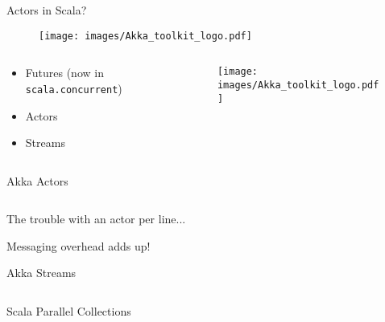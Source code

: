 \documentclass[aspectratio=169,14pt]{beamer}
\newcommand{\megatext}[1]{
  \begin{center}
    \Huge
    #1
  \end{center}
}
\newcommand{\bigtext}[1]{
  \begin{center}
    \Large
    #1
  \end{center}
}
\begin{document}
\begin{frame}
  \megatext{Actors in Scala?}
\end{frame}


\begin{frame}
  \begin{figure}
    \texttt{[image: images/Akka\_toolkit\_logo.pdf]}
  \end{figure}
\end{frame}

\begin{frame}
  \begin{columns}[c]
    \begin{column}{0.5\textwidth}
      \begin{itemize}
      \item Futures (now in \texttt{scala.concurrent})
      \item Actors
      \item Streams
      \end{itemize}
    \end{column}

    \begin{column}{0.5\textwidth}
      \begin{figure}
        \texttt{[image: images/Akka\_toolkit\_logo.pdf]}
      \end{figure}
    \end{column}
  \end{columns}
\end{frame}


\begin{frame}[fragile]{Akka Actors}
  \inputminted{scala}{snippets/actor.scala}
\end{frame}


\begin{frame}
  \bigtext{The trouble with an actor per line...}
\end{frame}

\begin{frame}
  \megatext{Messaging overhead adds up!}
\end{frame}

\begin{frame}[fragile]{Akka Streams}
  \inputminted{scala}{snippets/streams.scala}
\end{frame}


\begin{frame}[fragile]{Scala Parallel Collections}
  \inputminted{scala}{snippets/pcoll.scala}
\end{frame}
\end{document}
